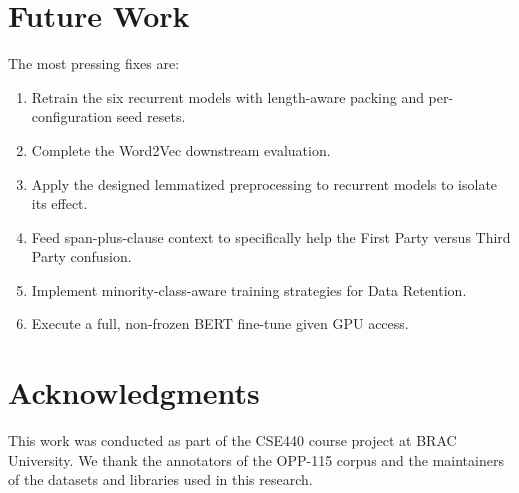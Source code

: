 \documentclass[11pt]{article}
\begin{document}
\section{Future Work}

The most pressing fixes are:
\begin{enumerate}
\item Retrain the six recurrent models with length-aware packing and per-configuration seed resets.
\item Complete the Word2Vec downstream evaluation.
\item Apply the designed lemmatized preprocessing to recurrent models to isolate its effect.
\item Feed span-plus-clause context to specifically help the First Party versus Third Party confusion.
\item Implement minority-class-aware training strategies for Data Retention.
\item Execute a full, non-frozen BERT fine-tune given GPU access.
\end{enumerate}

\section*{Acknowledgments}

This work was conducted as part of the CSE440 course project at BRAC University. We thank the annotators of the OPP-115 corpus and the maintainers of the datasets and libraries used in this research.



\end{document}
